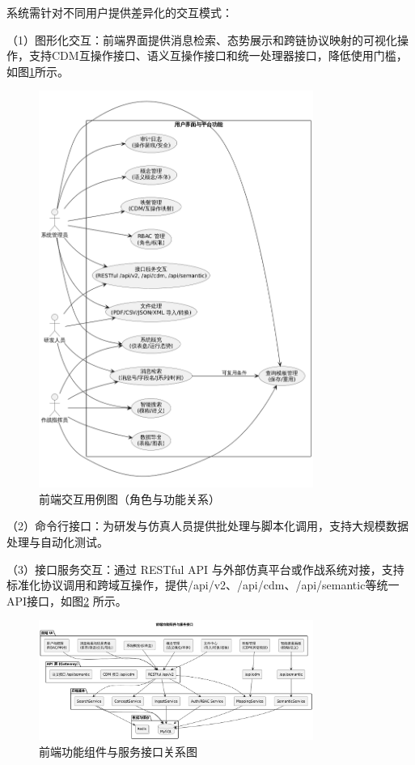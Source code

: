 系统需针对不同用户提供差异化的交互模式\cite{reid_2018_nav_leo}：

（1）图形化交互：前端界面提供消息检索、态势展示和跨链协议映射的可视化操作，支持CDM互操作接口、语义互操作接口和统一处理器接口，降低使用门槛，如图\ref{fig_usecase_frontend}所示。
\begin{figure}[H]
    \centering
    \includegraphics[width=0.8\textwidth,height=0.5\textheight,keepaspectratio]{chapters/fig-0/usecase_frontend.png}
    \caption{前端交互用例图（角色与功能关系）}
    \label{fig_usecase_frontend}
  \end{figure}
（2）命令行接口：为研发与仿真人员提供批处理与脚本化调用，支持大规模数据处理与自动化测试。

（3）接口服务交互：通过 RESTful API 与外部仿真平台或作战系统对接，支持标准化协议调用和跨域互操作，提供/api/v2、/api/cdm、/api/semantic等统一API接口，如图\ref{fig_component_frontend} 所示。



\begin{figure}[H]
  \centering
  \includegraphics[width=0.8\textwidth,height=0.6\textheight,keepaspectratio]{chapters/fig-0/component_frontend.png}
  \caption{前端功能组件与服务接口关系图}
  \label{fig_component_frontend}
\end{figure}


